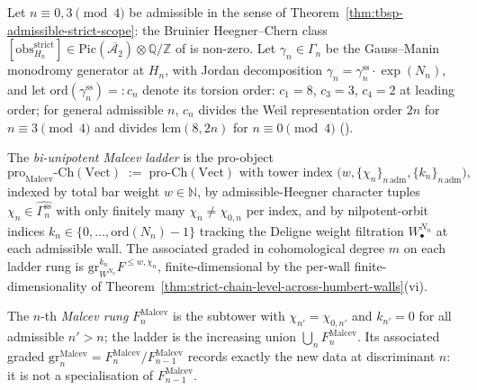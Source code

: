 \begin{definition}
\label{def:malcev-ladder-admissible-heegner}
%
%
%
Let $n\equiv 0,3\pmod 4$ be admissible in the sense of
Theorem~\textup{\ref{thm:tbsp-admissible-strict-scope}}: the
Bruinier Heegner--Chern class
$[\mathrm{obs}^{\mathrm{strict}}_{H_n}]\in
\mathrm{Pic}(\overline{\mathcal{A}_2})\otimes\mathbb Q/\mathbb Z$ of
\cite[Thm.~1.1]{Bruinier2002LNM} is non-zero. Let $\gamma_n\in\Gamma_n$
be the Gauss--Manin monodromy generator at $H_n$, with Jordan
decomposition $\gamma_n=\gamma_n^{\mathrm{ss}}\cdot\exp(N_n)$, and let
$\mathrm{ord}(\gamma_n^{\mathrm{ss}})=:c_n$ denote its torsion order:
$c_1=8$, $c_3=3$, $c_4=2$ at leading order; for general admissible
$n$, $c_n$ divides the Weil representation order $2n$ for
$n\equiv 3\pmod 4$ and divides $\mathrm{lcm}(8,2n)$ for
$n\equiv 0\pmod 4$ (\cite[Prop.~5.1]{Bruinier2002LNM}).

The \emph{bi-unipotent Malcev ladder} is the pro-object
\[
 \mathrm{pro}_{\mathrm{Malcev}}\text{-}\mathrm{Ch}(\mathrm{Vect})
 \;:=\;
 \mathrm{pro}\text{-}\mathrm{Ch}(\mathrm{Vect})
 \text{ with tower index }
 \bigl(w,\{\chi_n\}_{n\,\mathrm{adm}},\{k_n\}_{n\,\mathrm{adm}}\bigr),
\]
indexed by total bar weight $w\in\mathbb N$, by admissible-Heegner
character tuples $\chi_n\in\widehat{\Gamma_n^{\mathrm{ss}}}$ with only
finitely many $\chi_n\neq\chi_{0,n}$ per index, and by nilpotent-orbit
indices $k_n\in\{0,\ldots,\mathrm{ord}(N_n)-1\}$ tracking the Deligne
weight filtration $W^{N_n}_\bullet$ at each admissible wall. The
associated graded in cohomological degree $m$ on each ladder rung is
$\mathrm{gr}^{k_n}_{W^{N_n}}F^{\leq w,\chi_n}$, finite-dimensional by
the per-wall finite-dimensionality of
Theorem~\textup{\ref{thm:strict-chain-level-across-humbert-walls}}(vi).

The $n$-th \emph{Malcev rung} $F_n^{\mathrm{Malcev}}$ is the subtower
with $\chi_{n'}=\chi_{0,n'}$ and $k_{n'}=0$ for all admissible $n'>n$;
the ladder is the increasing union
$\bigcup_n F_n^{\mathrm{Malcev}}$. Its associated graded
$\mathrm{gr}_n^{\mathrm{Malcev}} = F_n^{\mathrm{Malcev}}/F_{n-1}^{\mathrm{Malcev}}$
records exactly the new data at discriminant $n$: it is not a
specialisation of $F_{n-1}^{\mathrm{Malcev}}$.
\end{definition}

